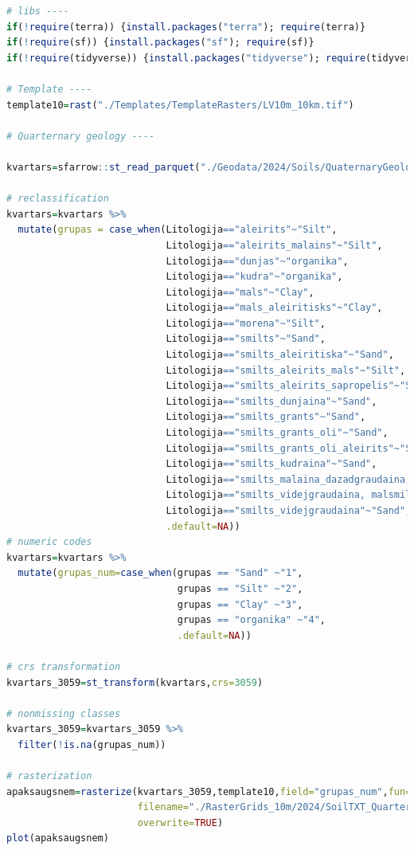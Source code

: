 \documentclass[
]{book}
\begin{document}
\begin{lstlisting}[language=R]
# libs ----
if(!require(terra)) {install.packages("terra"); require(terra)}
if(!require(sf)) {install.packages("sf"); require(sf)}
if(!require(tidyverse)) {install.packages("tidyverse"); require(tidyverse)}

# Template ----
template10=rast("./Templates/TemplateRasters/LV10m_10km.tif")

# Quarternary geology ----

kvartars=sfarrow::st_read_parquet("./Geodata/2024/Soils/QuaternaryGeology_LV/Kvartargeologija.parquet")

# reclassification
kvartars=kvartars %>% 
  mutate(grupas = case_when(Litologija=="aleirits"~"Silt",
                            Litologija=="aleirits_malains"~"Silt",
                            Litologija=="dunjas"~"organika",
                            Litologija=="kudra"~"organika",
                            Litologija=="mals"~"Clay",
                            Litologija=="mals_aleiritisks"~"Clay",
                            Litologija=="morena"~"Silt",
                            Litologija=="smilts"~"Sand",
                            Litologija=="smilts_aleiritiska"~"Sand",
                            Litologija=="smilts_aleirits_mals"~"Silt",
                            Litologija=="smilts_aleirits_sapropelis"~"Silt",
                            Litologija=="smilts_dunjaina"~"Sand",
                            Litologija=="smilts_grants"~"Sand",
                            Litologija=="smilts_grants_oli"~"Sand",
                            Litologija=="smilts_grants_oli_aleirits"~"Sand",
                            Litologija=="smilts_kudraina"~"Sand",
                            Litologija=="smilts_malaina_dazadgraudaina, malsmilts"~"Silt",
                            Litologija=="smilts_videjgraudaina, malsmilts"~"Sand",
                            Litologija=="smilts_videjgraudaina"~"Sand",
                            .default=NA))
# numeric codes
kvartars=kvartars %>% 
  mutate(grupas_num=case_when(grupas == "Sand" ~"1",
                              grupas == "Silt" ~"2",
                              grupas == "Clay" ~"3",
                              grupas == "organika" ~"4",
                              .default=NA))

# crs transformation
kvartars_3059=st_transform(kvartars,crs=3059)

# nonmissing classes
kvartars_3059=kvartars_3059 %>% 
  filter(!is.na(grupas_num))

# rasterization
apaksaugsnem=rasterize(kvartars_3059,template10,field="grupas_num",fun="max",
                       filename="./RasterGrids_10m/2024/SoilTXT_QuarternaryLV.tif",
                       overwrite=TRUE)
plot(apaksaugsnem)
\end{lstlisting}
\end{document}
